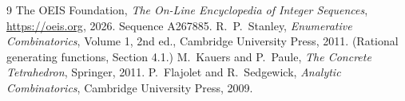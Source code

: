 \documentclass[11pt,a4paper]{article}
\theoremstyle{plain}
\theoremstyle{definition}
\begin{document}
\begin{thebibliography}{9}
 The OEIS Foundation, \emph{The On-Line Encyclopedia of Integer
Sequences}, \url{https://oeis.org}, 2026. Sequence A267885.
 R.~P.~Stanley, \emph{Enumerative Combinatorics}, Volume 1, 2nd ed.,
Cambridge University Press, 2011. (Rational generating functions, Section 4.1.)
 M.~Kauers and P.~Paule, \emph{The Concrete Tetrahedron}, Springer, 2011.
 P.~Flajolet and R.~Sedgewick, \emph{Analytic Combinatorics}, Cambridge
University Press, 2009.
\end{thebibliography}
\end{document}
